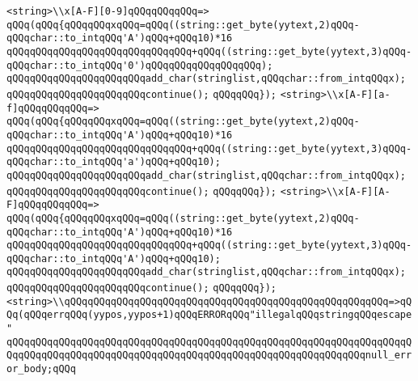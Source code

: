 \verb|<string>\\x[A-F][0-9]qQQqqQQqqQQq=>|\newline
\verb|qQQq(qQQq{qQQqqQQqxqQQq=qQQq((string::get_byte(yytext,2)qQQq-qQQqchar::to_intqQQq'A')qQQq+qQQq10)*16|\newline
\verb|qQQqqQQqqQQqqQQqqQQqqQQqqQQqqQQq+qQQq((string::get_byte(yytext,3)qQQq-qQQqchar::to_intqQQq'0')qQQqqQQqqQQqqQQqqQQq);|\newline
\verb|qQQqqQQqqQQqqQQqqQQqqQQqadd_char(stringlist,qQQqchar::from_intqQQqx);|\newline
\verb|qQQqqQQqqQQqqQQqqQQqqQQqcontinue();|\newline
\verb|qQQqqQQq});|\newline
\verb|<string>\\x[A-F][a-f]qQQqqQQqqQQq=>|\newline
\verb|qQQq(qQQq{qQQqqQQqxqQQq=qQQq((string::get_byte(yytext,2)qQQq-qQQqchar::to_intqQQq'A')qQQq+qQQq10)*16|\newline
\verb|qQQqqQQqqQQqqQQqqQQqqQQqqQQqqQQq+qQQq((string::get_byte(yytext,3)qQQq-qQQqchar::to_intqQQq'a')qQQq+qQQq10);|\newline
\verb|qQQqqQQqqQQqqQQqqQQqqQQqadd_char(stringlist,qQQqchar::from_intqQQqx);|\newline
\verb|qQQqqQQqqQQqqQQqqQQqqQQqcontinue();|\newline
\verb|qQQqqQQq});|\newline
\verb|<string>\\x[A-F][A-F]qQQqqQQqqQQq=>|\newline
\verb|qQQq(qQQq{qQQqqQQqxqQQq=qQQq((string::get_byte(yytext,2)qQQq-qQQqchar::to_intqQQq'A')qQQq+qQQq10)*16|\newline
\verb|qQQqqQQqqQQqqQQqqQQqqQQqqQQqqQQq+qQQq((string::get_byte(yytext,3)qQQq-qQQqchar::to_intqQQq'A')qQQq+qQQq10);|\newline
\verb|qQQqqQQqqQQqqQQqqQQqqQQqadd_char(stringlist,qQQqchar::from_intqQQqx);|\newline
\verb|qQQqqQQqqQQqqQQqqQQqqQQqcontinue();|\newline
\verb|qQQqqQQq});|\newline
\newline
\verb|<string>\\qQQqqQQqqQQqqQQqqQQqqQQqqQQqqQQqqQQqqQQqqQQqqQQqqQQqqQQq=>qQQq(qQQqerrqQQq(yypos,yypos+1)qQQqERRORqQQq"illegalqQQqstringqQQqescape"|\newline
\verb|qQQqqQQqqQQqqQQqqQQqqQQqqQQqqQQqqQQqqQQqqQQqqQQqqQQqqQQqqQQqqQQqqQQqqQQqqQQqqQQqqQQqqQQqqQQqqQQqqQQqqQQqqQQqqQQqqQQqqQQqqQQqqQQqqQQqnull_error_body;qQQq|\newline
